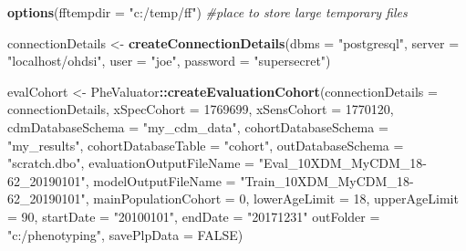 \documentclass[
]{article}
\newenvironment{Shaded}{\begin{snugshade}}{\end{snugshade}}
\newcommand{\CommentTok}[1]{\textcolor[rgb]{0.56,0.35,0.01}{\textit{#1}}}
\newcommand{\DataTypeTok}[1]{\textcolor[rgb]{0.13,0.29,0.53}{#1}}
\newcommand{\DecValTok}[1]{\textcolor[rgb]{0.00,0.00,0.81}{#1}}
\newcommand{\KeywordTok}[1]{\textcolor[rgb]{0.13,0.29,0.53}{\textbf{#1}}}
\newcommand{\NormalTok}[1]{#1}
\newcommand{\OperatorTok}[1]{\textcolor[rgb]{0.81,0.36,0.00}{\textbf{#1}}}
\newcommand{\OtherTok}[1]{\textcolor[rgb]{0.56,0.35,0.01}{#1}}
\newcommand{\StringTok}[1]{\textcolor[rgb]{0.31,0.60,0.02}{#1}}
\begin{document}
\begin{Shaded}
\begin{Highlighting}[]
\KeywordTok{options}\NormalTok{(}\DataTypeTok{fftempdir =} \StringTok{"c:/temp/ff"}\NormalTok{) }\CommentTok{#place to store large temporary files}


\NormalTok{connectionDetails <-}\StringTok{ }\KeywordTok{createConnectionDetails}\NormalTok{(}\DataTypeTok{dbms =} \StringTok{"postgresql"}\NormalTok{,}
                                              \DataTypeTok{server =} \StringTok{"localhost/ohdsi"}\NormalTok{,}
                                              \DataTypeTok{user =} \StringTok{"joe"}\NormalTok{,}
                                              \DataTypeTok{password =} \StringTok{"supersecret"}\NormalTok{)}

\NormalTok{evalCohort <-}\StringTok{ }\NormalTok{PheValuator}\OperatorTok{::}\KeywordTok{createEvaluationCohort}\NormalTok{(}\DataTypeTok{connectionDetails =}\NormalTok{ connectionDetails,}
                              \DataTypeTok{xSpecCohort =} \DecValTok{1769699}\NormalTok{, }
                              \DataTypeTok{xSensCohort =} \DecValTok{1770120}\NormalTok{, }
                              \DataTypeTok{cdmDatabaseSchema =} \StringTok{"my_cdm_data"}\NormalTok{,}
                              \DataTypeTok{cohortDatabaseSchema =} \StringTok{"my_results"}\NormalTok{,}
                              \DataTypeTok{cohortDatabaseTable =} \StringTok{"cohort"}\NormalTok{,}
                              \DataTypeTok{outDatabaseSchema =} \StringTok{"scratch.dbo"}\NormalTok{,}
                              \DataTypeTok{evaluationOutputFileName =} \StringTok{"Eval_10XDM_MyCDM_18-62_20190101"}\NormalTok{,}
                              \DataTypeTok{modelOutputFileName =} \StringTok{"Train_10XDM_MyCDM_18-62_20190101"}\NormalTok{,}
                              \DataTypeTok{mainPopulationCohort =} \DecValTok{0}\NormalTok{, }
                              \DataTypeTok{lowerAgeLimit =} \DecValTok{18}\NormalTok{, }
                              \DataTypeTok{upperAgeLimit =} \DecValTok{90}\NormalTok{,}
                              \DataTypeTok{startDate =} \StringTok{"20100101"}\NormalTok{,}
                              \DataTypeTok{endDate =} \StringTok{"20171231"}
                              \DataTypeTok{outFolder =} \StringTok{"c:/phenotyping"}\NormalTok{,}
                              \DataTypeTok{savePlpData =} \OtherTok{FALSE}\NormalTok{)}
\end{Highlighting}
\end{Shaded}
\end{document}
